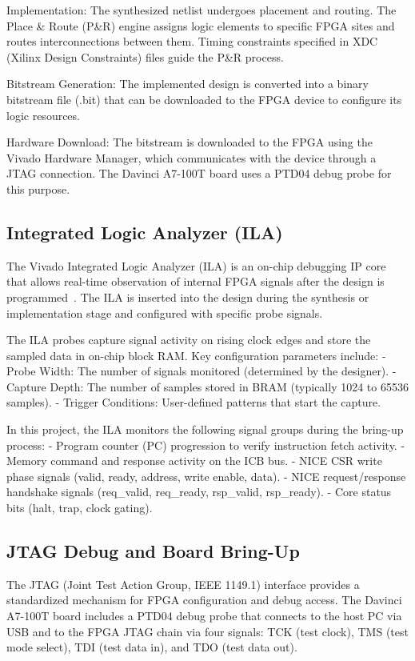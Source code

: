 Implementation: The synthesized netlist undergoes placement and routing. The Place \& Route (P\&R) engine assigns logic elements to specific FPGA sites and routes interconnections between them. Timing constraints specified in XDC (Xilinx Design Constraints) files guide the P\&R process.


Bitstream Generation: The implemented design is converted into a binary bitstream file (.bit) that can be downloaded to the FPGA device to configure its logic resources.


Hardware Download: The bitstream is downloaded to the FPGA using the Vivado Hardware Manager, which communicates with the device through a JTAG connection. The Davinci A7-100T board uses a PTD04 debug probe for this purpose.


\subsection{Integrated Logic Analyzer (ILA)}

The Vivado Integrated Logic Analyzer (ILA) is an on-chip debugging IP core that allows real-time observation of internal FPGA signals after the design is programmed~\cite{XILINX_UG908}. The ILA is inserted into the design during the synthesis or implementation stage and configured with specific probe signals.


The ILA probes capture signal activity on rising clock edges and store the sampled data in on-chip block RAM. Key configuration parameters include: - Probe Width: The number of signals monitored (determined by the designer). - Capture Depth: The number of samples stored in BRAM (typically 1024 to 65536 samples). - Trigger Conditions: User-defined patterns that start the capture.


In this project, the ILA monitors the following signal groups during the bring-up process: - Program counter (PC) progression to verify instruction fetch activity. - Memory command and response activity on the ICB bus. - NICE CSR write phase signals (valid, ready, address, write enable, data). - NICE request/response handshake signals (req\_valid, req\_ready, rsp\_valid, rsp\_ready). - Core status bits (halt, trap, clock gating).


\subsection{JTAG Debug and Board Bring-Up}

The JTAG (Joint Test Action Group, IEEE 1149.1) interface provides a standardized mechanism for FPGA configuration and debug access. The Davinci A7-100T board includes a PTD04 debug probe that connects to the host PC via USB and to the FPGA JTAG chain via four signals: TCK (test clock), TMS (test mode select), TDI (test data in), and TDO (test data out).


